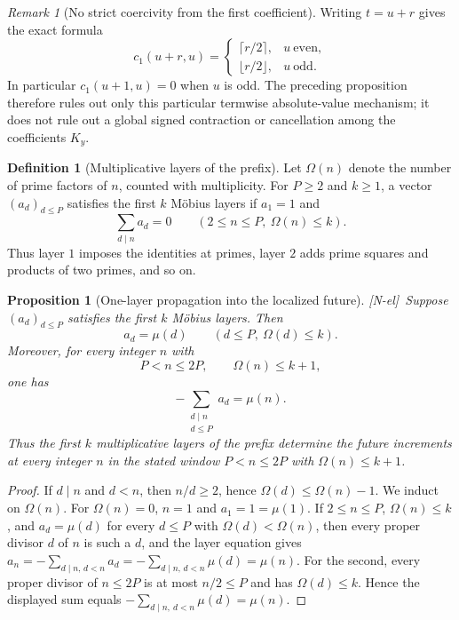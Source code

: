 \documentclass[11pt]{amsart}
\numberwithin{equation}{section}
\theoremstyle{plain}
\newtheorem{proposition}[theorem]{Proposition}
\theoremstyle{definition}
\newtheorem{definition}[theorem]{Definition}
\theoremstyle{remark}
\newtheorem{remark}[theorem]{Remark}
\newcommand{\tagNE}{\textup{[N-el]}}
\begin{document}
\begin{remark}[No strict coercivity from the first coefficient]
\label{rem:c1-parity}
Writing $t=u+r$ gives the exact formula
\[
c_1(u+r,u)=
\begin{cases}
\lceil r/2\rceil,&u\ \text{even},\\
\lfloor r/2\rfloor,&u\ \text{odd}.
\end{cases}
\]
In particular $c_1(u+1,u)=0$ when $u$ is odd.  The preceding proposition
therefore rules out only this particular termwise absolute-value mechanism;
it does not rule out a global signed contraction or cancellation among the
coefficients $K_y$.
\end{remark}

\begin{definition}[Multiplicative layers of the prefix]
\label{def:multiplicative-layers}
Let $\Omega(n)$ denote the number of prime factors of $n$, counted with
multiplicity.  For $P\ge2$ and $k\ge1$, a vector
$(a_d)_{d\le P}$ satisfies the first $k$ M\"obius layers if
$a_1=1$ and
\[
\sum_{d\mid n}a_d=0
\qquad(2\le n\le P,\ \Omega(n)\le k).
\]
Thus layer $1$ imposes the identities at primes, layer $2$ adds prime
squares and products of two primes, and so on.
\end{definition}

\begin{proposition}[One-layer propagation into the localized future]
\label{prop:layer-propagation}
\tagNE\ Suppose $(a_d)_{d\le P}$ satisfies the first $k$ M\"obius layers. Then
\[
a_d=\mu(d)\qquad(d\le P,\ \Omega(d)\le k).
\]
Moreover, for every integer $n$ with
\[
P<n\le2P,\qquad\Omega(n)\le k+1,
\]
one has
\[
-\sum_{\substack{d\mid n\\d\le P}}a_d=\mu(n).
\]
Thus the first $k$ multiplicative layers of the prefix determine the
future increments at every integer $n$ in the stated window
$P<n\le2P$ with $\Omega(n)\le k+1$.
\end{proposition}

\begin{proof}
If $d\mid n$ and $d<n$, then $n/d\ge2$, hence $\Omega(d)\le\Omega(n)-1$.
We induct on $\Omega(n)$. For $\Omega(n)=0$, $n=1$ and $a_1=1=\mu(1)$. If
$2\le n\le P$, $\Omega(n)\le k$, and $a_d=\mu(d)$ for every $d\le P$ with
$\Omega(d)<\Omega(n)$, then every proper divisor $d$ of $n$ is such a $d$, and
the layer equation gives
$a_n=-\sum_{d\mid n,\,d<n}a_d=-\sum_{d\mid n,\,d<n}\mu(d)=\mu(n)$.  For the second, every
proper divisor of $n\le2P$ is at most $n/2\le P$ and has
$\Omega(d)\le k$.  Hence the displayed sum equals
$-\sum_{d\mid n,\ d<n}\mu(d)=\mu(n)$.
\end{proof}
\end{document}
